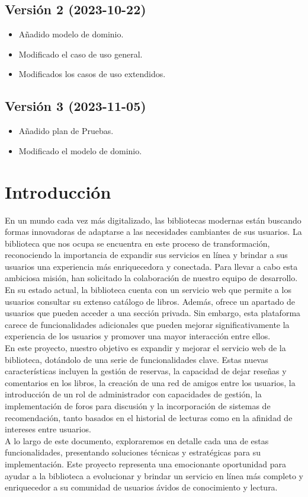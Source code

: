 ﻿\documentclass{report}
\begin{document}
        \section{Versión 2 (2023-10-22)}
            \begin{itemize}
                \item Añadido modelo de dominio.
                \item Modificado el caso de uso general.
                \item Modificados los casos de uso extendidos.
            \end{itemize}
        \section{Versión 3 (2023-11-05)}
            \begin{itemize}
                \item Añadido plan de Pruebas.
                \item Modificado el modelo de dominio.
            \end{itemize}
    \chapter{Introducción}
    En un mundo cada vez más digitalizado, las bibliotecas modernas están buscando formas innovadoras de adaptarse a las necesidades cambiantes de sus usuarios. La biblioteca que nos ocupa se encuentra en este proceso de transformación, reconociendo la importancia de expandir sus servicios en línea y brindar a sus usuarios una experiencia más enriquecedora y conectada. Para llevar a cabo esta ambiciosa misión, han solicitado la colaboración de nuestro equipo de desarrollo.\\
    En su estado actual, la biblioteca cuenta con un servicio web que permite a los usuarios consultar su extenso catálogo de libros. Además, ofrece un apartado de usuarios que pueden acceder a una sección privada. Sin embargo, esta plataforma carece de funcionalidades adicionales que pueden mejorar significativamente la experiencia de los usuarios y promover una mayor interacción entre ellos.\\
    En este proyecto, nuestro objetivo es expandir y mejorar el servicio web de la biblioteca, dotándolo de una serie de funcionalidades clave. Estas nuevas características incluyen la gestión de reservas, la capacidad de dejar reseñas y comentarios en los libros, la creación de una red de amigos entre los usuarios, la introducción de un rol de administrador con capacidades de gestión, la implementación de foros para discusión y la incorporación de sistemas de recomendación, tanto basados en el historial de lecturas como en la afinidad de intereses entre usuarios.\\
    A lo largo de este documento, exploraremos en detalle cada una de estas funcionalidades, presentando soluciones técnicas y estratégicas para su implementación. Este proyecto representa una emocionante oportunidad para ayudar a la biblioteca a evolucionar y brindar un servicio en línea más completo y enriquecedor a su comunidad de usuarios ávidos de conocimiento y lectura.\\
\end{document}

